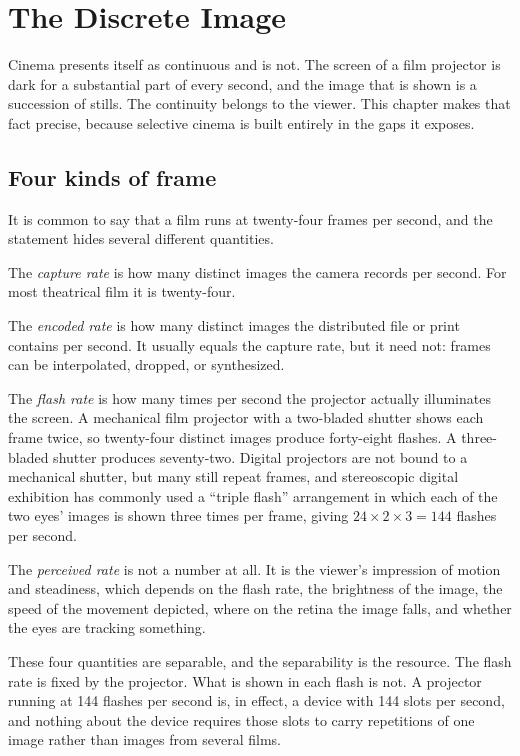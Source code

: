 \chapter{The Discrete Image}\label{ch:discrete}

Cinema presents itself as continuous and is not. The screen of a film projector is dark for a substantial part of every second, and the image that is shown is a succession of stills. The continuity belongs to the viewer. This chapter makes that fact precise, because selective cinema is built entirely in the gaps it exposes.

\section{Four kinds of frame}

It is common to say that a film runs at twenty-four frames per second, and the statement hides several different quantities.

The \emph{capture rate} is how many distinct images the camera records per second. For most theatrical film it is twenty-four.

The \emph{encoded rate} is how many distinct images the distributed file or print contains per second. It usually equals the capture rate, but it need not: frames can be interpolated, dropped, or synthesized.

The \emph{flash rate} is how many times per second the projector actually illuminates the screen. A mechanical film projector with a two-bladed shutter shows each frame twice, so twenty-four distinct images produce forty-eight flashes. A three-bladed shutter produces seventy-two. Digital projectors are not bound to a mechanical shutter, but many still repeat frames, and stereoscopic digital exhibition has commonly used a ``triple flash'' arrangement in which each of the two eyes' images is shown three times per frame, giving $24\times 2\times 3=144$ flashes per second.

The \emph{perceived rate} is not a number at all. It is the viewer's impression of motion and steadiness, which depends on the flash rate, the brightness of the image, the speed of the movement depicted, where on the retina the image falls, and whether the eyes are tracking something.

These four quantities are separable, and the separability is the resource. The flash rate is fixed by the projector. What is shown in each flash is not. A projector running at 144 flashes per second is, in effect, a device with 144 slots per second, and nothing about the device requires those slots to carry repetitions of one image rather than images from several films.


